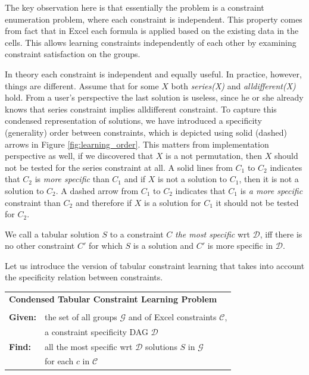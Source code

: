 \documentclass{ecai}
\newcommand{\constraints}{\ensuremath{\mathcal{C}}\xspace}
\newcommand{\dependencies}{\ensuremath{\mathcal{D}}\xspace}
\newcommand{\groups}{\ensuremath{\mathcal{G}}\xspace}
\begin{document}
  The key observation here is that essentially the problem is a constraint enumeration problem, where each constraint is independent. This property comes from fact that in Excel each formula is applied based on the existing data in the cells. This allows learning constraints independently of each other by examining constraint satisfaction on the groups.


  In theory each constraint is independent and equally useful. In practice, however, things are different. Assume that for some $X$ both \textit{series(X)} and \textit{alldifferent(X)} hold. From a user's perspective the last solution is useless, since he or she already knows that series constraint implies alldifferent constraint. To capture this condensed representation \cite{condensed} of solutions, we have introduced a specificity (generality) order between constraints, which is depicted using solid (dashed) arrows in Figure \ref{fig:learning_order}. This matters from implementation perspective as well, if we discovered that $X$ is a not permutation, then $X$ should not be tested for the series constraint at all. A solid lines from $C_1$ to $C_2$ indicates that $C_2$ is \textit{more specific} than $C_1$ and if $X$ is not a solution to $C_1$, then it is not a solution to $C_2$. A dashed arrow from $C_1$ to $C_2$ indicates that $C_1$ is \textit{a more specific} constraint than $C_2$ and therefore if $X$ is a solution for $C_1$ it should not be tested for $C_2$.

We call a tabular solution $S$ to a constraint $C$ \textit{the most specific} wrt \dependencies, iff there is no other constraint $C'$ for which $S$ is a solution and $C'$ is more specific in \dependencies.


Let us introduce the version of tabular constraint learning that takes into account the specificity relation between constraints.

\begin{minipage}[c]{14em}
  \vspace{5pt}
  \begin{tabular}{ll}
    \multicolumn{2}{l}{{\textbf{Condensed Tabular Constraint Learning Problem}}}\\
    \vspace{-4pt}
    &\\
    \textbf{Given:}& the set of all groups $\groups$ and of Excel constraints $\constraints$,\\ 
    & a constraint specificity DAG \dependencies \\
    \textbf{Find:}& all the most specific wrt \dependencies solutions $S$ in \groups\\ & for each $c$ in \constraints \\
  \end{tabular}
  \vspace{6pt}
\end{minipage}
\end{document}

